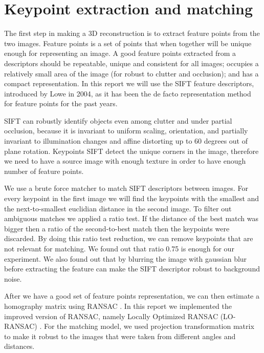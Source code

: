\section{Keypoint extraction and matching}
\label{matching}
The first step in making a 3D reconstruction is to extract feature points from the two images. 
Feature points is a set of points that when together will be unique enough for representing an image.
A good feature points extracted from a descriptors should be repeatable, unique and consistent for all images; occupies a relatively small area of the image (for robust to clutter and occlusion); and has a compact representation.
In this report we will use the SIFT feature descriptors, introduced by Lowe\cite{SIFT} in 2004, as it has been the de facto representation method for feature points for the past years.

SIFT can robustly identify objects even among clutter and under partial occlusion, because it is invariant to uniform scaling, orientation, and partially invariant to illumination changes and affine distorting up to 60 degrees out of plane rotation.
Keypoints SIFT detect the unique corners in the image, therefore we need to have a source image with enough texture in order to have enough number of feature points.

We use a brute force matcher to match SIFT descriptors between images. 
For every keypoint in the first image we will find the keypoints with the smallest and the next-to-smallest euclidian distance in the second image. 
To filter out ambiguous matches we applied a ratio test. 
If the distance of the best match was bigger then a ratio of the second-to-best match then the keypoints were discarded.
By doing this ratio test reduction, we can remove keypoints that are not relevant for matching.
We found out that ratio 0.75 is enough for our experiment.
We also found out that by blurring the image with gaussian blur before extracting the feature can make the SIFT descriptor robust to background noise.

After we have a good set of feature points representation, we can then estimate a homography matrix using RANSAC \cite{RANSAC}. 
In this report we implemented the improved version of RANSAC, namely Locally Optimized RANSAC (LO-RANSAC) \cite{LORANSAC}.
For the matching model, we used projection transformation matrix to make it robust to the images that were taken from different angles and distances.


